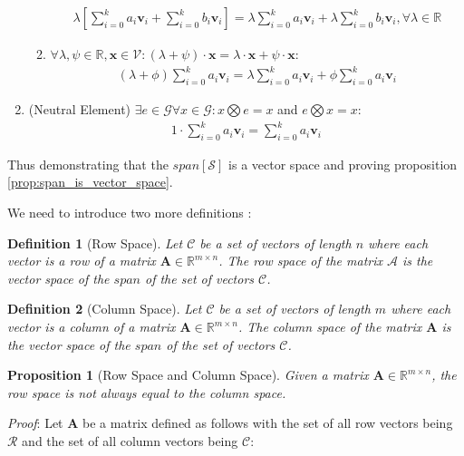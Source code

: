 \documentclass[a4paper,12pt]{article}
\newcommand{\set}[1]{\mathcal{#1}}
\newcommand{\operation}{\bigotimes}
\newcommand{\matrx}[1]{\bm{#1}}
\newcommand{\vectr}[1]{\textbf{#1}}
\newcommand{\real}{\mathbb{R}}
\newcommand{\italic}[1]{\textit{#1}}
\newcommand{\lcomb}[1]{\sum_{i = 0}^{k} {#1} \vectr{v}_i}
\newtheorem{definition}{Definition}[section]
\newtheorem{proposition}{Proposition}[section]
\begin{document}
\begin{enumerate}
\begin{enumerate}
			\begin{align}
				\lambda \left[ \lcomb{a_i} + \lcomb{b_i} \right] = \lambda \lcomb{a_i} + \lambda \lcomb{b_i}, \forall \lambda \in \real
			\end{align}
			\item $\forall \lambda, \psi \in \real, \vectr{x} \in \set{V}: (\lambda + \psi) \cdot \vectr{x} = \lambda \cdot \vectr{x} + \psi \cdot \vectr{x}$:
			\begin{align}
				(\lambda + \phi)\lcomb{a_i} = \lambda \lcomb{a_i} + \phi \lcomb{a_i}
			\end{align}
		\end{enumerate} 
		\item (Neutral Element) $ \exists e  \in \set{G} \forall x \in \set{G} : x \operation e = x$ and $ e \operation x = x $: 
		\begin{align}
			1 \cdot \lcomb{a_i} = \lcomb{a_i}
		\end{align}
	\end{enumerate}
	Thus demonstrating that the $ span[\set{S}] $ is a vector space and proving proposition \ref{prop:span_is_vector_space}. 
	
	We need to introduce two more definitions \cite{def_row_space_col_space}: 
	\begin{definition}[Row Space]
		\normalfont Let $\set{C}$ be a set of vectors of length $n$ where each vector is a row of a matrix $\matrx{A} \in \real^{m \times n}$. The row space of the matrix $\set{A}$ is the vector space of the $span$ of the set of vectors $\set{C}$. 
	\end{definition}
	\begin{definition}[Column Space]
		\normalfont Let $\set{C}$ be a set of vectors of length $m$ where each vector is a column of a matrix $\matrx{A} \in \real^{m \times n}$. The column space of the matrix $\matrx{A}$ is the vector space of the $span$ of the set of vectors $\set{C}$. 
	\end{definition}
	\begin{proposition}[Row Space and Column Space]
		\normalfont Given a matrix $ \matrx{A} \in \real^{m \times n} $, the row space is not always equal to the column space.
	\end{proposition}
	\italic{Proof}: Let $ \matrx{A} $ be a matrix defined as follows with the set of all row vectors being $ \set{R} $ and the set of all column vectors being $ \set{C} $:
	
\end{document}
